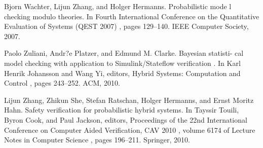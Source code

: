 \documentclass[runningheads,a4paper]{llncs}
\begin{document}
\noindent[WZH07] Bjorn Wachter, Lijun Zhang, and Holger Hermanns. Probabilistic mode l checking modulo theories. In Fourth International Conference on the Quantitative Evaluation of Systems (QEST 2007) , pages 129–140. IEEE Computer Society, 2007.

\noindent[ZPC10] Paolo Zuliani, Andr?e Platzer, and Edmund M. Clarke. Bayesian statisti- cal model checking with application to Simulink/Stateflow verification . In Karl Henrik Johansson and Wang Yi, editors, Hybrid Systems: Computation and Control , pages 243–252. ACM, 2010.

\noindent[ZSR + 10] Lijun Zhang, Zhikun She, Stefan Ratschan, Holger Hermanns, and Ernst Moritz Hahn. Safety verification for probabilistic hybrid systems. In Tayssir Touili, Byron Cook, and Paul Jackson, editors, Proceedings of the 22nd International Conference on Computer Aided Verification, CAV 2010 , volume 6174 of Lecture Notes in Computer Science , pages 196–211. Springer, 2010.
\end{document}
